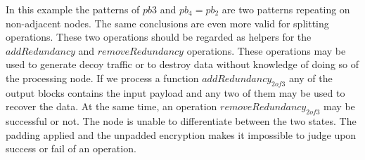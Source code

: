 \documentclass[acmsmall, screen]{acmart}
\begin{document}
%
In this example the patterns of $pb3$ and $pb_4=pb_2$ are two patterns repeating on non-adjacent nodes. The same conclusions are even more valid for splitting operations. These two operations should be regarded as helpers for the $addRedundancy$ and $removeRedundancy$ operations. These operations may be used to generate decoy traffic or to destroy data without knowledge of doing so of the processing node. If we process a function $addRedundancy_{2 of 3}$ any of the output blocks contains the input payload and any two of them may be used to recover the data. At the same time, an operation $removeRedundancy_{2 of 3}$ may be successful or not. The node is unable to differentiate between the two states. The padding applied and the unpadded encryption makes it impossible to judge upon success or fail of an operation.
\end{document}
